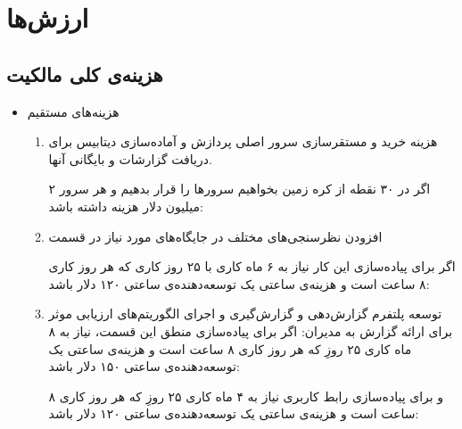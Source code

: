 \documentclass[12pt, dvipsnames, svgnames, x11names,]{article}
\begin{document}
\section{ارزش‌ها}
\subsection{هزینه‌ی کلی مالکیت }
\begin{itemize}
    \item 
    هزینه‌های مستقیم
    
    \begin{enumerate}
        \item 
        هزینه خرید و مستقرسازی سرور اصلی پردازش  و آماده‌سازی دیتابیس برای دریافت گزارشات و بایگانی آنها.
        
        اگر در ۳۰ نقطه از کره زمین بخواهیم سرور‌ها را قرار بدهیم و هر سرور ۲ میلیون دلار هزینه داشته باشد:
        
        \item 
        افزودن نظرسنجی‌های مختلف در جایگاه‌های مورد نیاز در قسمت 
        
        اگر برای پیاده‌سازی این کار نیاز به ۶ ماه کاری با ۲۵ روز کاری که هر روز کاری ۸ ساعت است و هزینه‌ی ساعتی یک توسعه‌دهنده‌ی  ساعتی ۱۲۰ دلار باشد:
        \begin{flushleft}
        \end{flushleft}
        
        \item
        توسعه پلتفرم گزارش‌دهی و گزارش‌گیری و اجرای الگوریتم‌های ارزیابی موثر برای ارائه گزارش به مدیران:
        اگر برای پیاده‌سازی منطق این قسمت، نیاز به ۸ ماه کاری ۲۵ روزِ که هر روز کاری ۸ ساعت است و هزینه‌ی ساعتی یک توسعه‌دهنده‌ی  ساعتی ۱۵۰ دلار باشد:
        \begin{flushleft}
        \end{flushleft}
        
        و برای پیاده‌سازی رابط کاربری نیاز به ۴ ماه کاری ۲۵ روزِ که هر روز کاری ۸ ساعت است و هزینه‌ی ساعتی یک توسعه‌دهنده‌ی  ساعتی ۱۲۰ دلار باشد:
        \begin{flushleft}
        \end{flushleft}
        

\end{enumerate}
\end{itemize}
\end{document}
